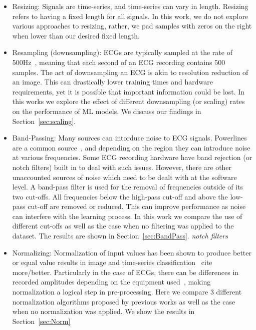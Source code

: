 \documentclass[pmlr,twocolumn]{jmlr}%
\begin{document}
\begin{itemize}
    \item Resizing: Signals are time-series, and time-series can vary in length. Resizing refers to having a fixed length for all signals. In this work, we do not explore various approaches to resizing, rather, we pad samples with zeros on the right when lower than our desired fixed length. 
    \item Resampling (downsampling): ECGs are typically sampled at the rate of 500Hz~\cite{luo2010review,uwaechia2021comprehensive}, meaning that each second of an ECG recording contains 500 samples. The act of downsampling an ECG is akin to resolution reduction of an image. This can drastically lower training times and hardware requirements, yet it is possible that important information could be lost. In this works we explore the effect of different downsampling (or scaling) rates on the performance of ML models. We discuss our findings in Section~\ref{sec:scaling}. 
    \item Band-Passing: Many sources can intorduce noise to ECG signals. Powerlines are a common source~\cite{uwaechia2021comprehensive}, and depending on the region they can introduce noise at various frequencies. Some ECG recording hardware have band rejection (or notch filters) built in to deal with such issues. However, there are other unaccounted sources of noise which need to be dealt with at the software level. A band-pass filter is used for the removal of frequencies outside of its two cut-offs. All frequencies below the high-pass cut-off and above the low-pass cut-off are removed or reduced. This can improve performance as noise can interfere with the learning process. In this work we compare the use of different cut-offs as well as the case when no filtering was applied to the dataset. The results are shown in Section~\ref{sec:BandPass}. \textit{notch filters}
    \item Normalizing: Normalization of input values has been shown to produce better or equal value results in image and time-series classification~\cite{bhanja2018impact}{\color{red} cite more/better}. Particularly in the case of ECGs, there can be differences in recorded amplitudes depending on the equipment used~\cite{uwaechia2021comprehensive}, making normalization a logical step in pre-processing. Here we compare 3 different normalization algorithms proposed by previous works as well as the case when no normalization was applied. We show the results in Section~\ref{sec:Norm}
\end{itemize}
\end{document}
